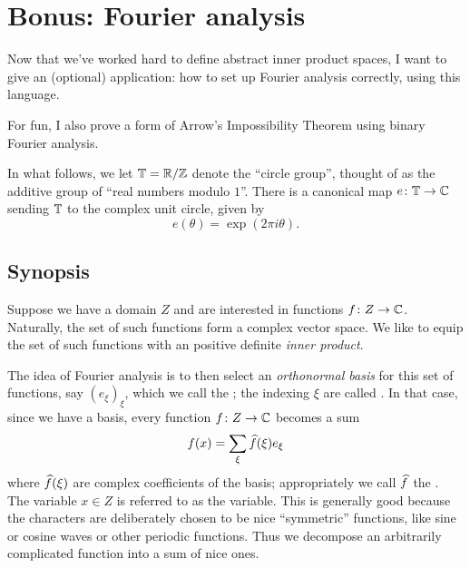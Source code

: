 \chapter{Bonus: Fourier analysis}
\label{ch:fourier}
Now that we've worked hard to define abstract inner product spaces,
I want to give an (optional) application:
how to set up Fourier analysis correctly, using this language.

For fun, I also prove a form of Arrow's Impossibility Theorem
using binary Fourier analysis.

In what follows, we let $\mathbb T = \mathbb R/\mathbb Z$ denote the ``circle group'',
thought of as the additive group of ``real numbers modulo $1$''.
There is a canonical map $e \colon \mathbb T \to \mathbb C$ sending $\mathbb T$ to the
complex unit circle, given by
\[ e(\theta) = \exp(2\pi i \theta). \]

\section{Synopsis}
Suppose we have a domain $Z$ and are interested in functions $f \colon Z \to \mathbb C$.
Naturally, the set of such functions form a complex vector space.
We like to equip the set of such functions
with an positive definite \emph{inner product}.

The idea of Fourier analysis is to then select an \emph{orthonormal basis}
for this set of functions, say $(e_\xi)_{\xi}$,
which we call the ;
the indexing $\xi$ are called .
In that case, since we have a basis, every function $f \colon Z \to \mathbb C$
becomes a sum
\[ f(x) = \sum_{\xi} \widehat f(\xi) e_\xi \]
where $\widehat f(\xi)$ are complex coefficients of the basis;
appropriately we call $\widehat f$ the .
The variable $x \in Z$ is referred to as the  variable.
This is generally good because the characters are deliberately chosen
to be nice ``symmetric'' functions,
like sine or cosine waves or other periodic functions.
Thus we decompose an arbitrarily complicated function into a sum of nice ones.

